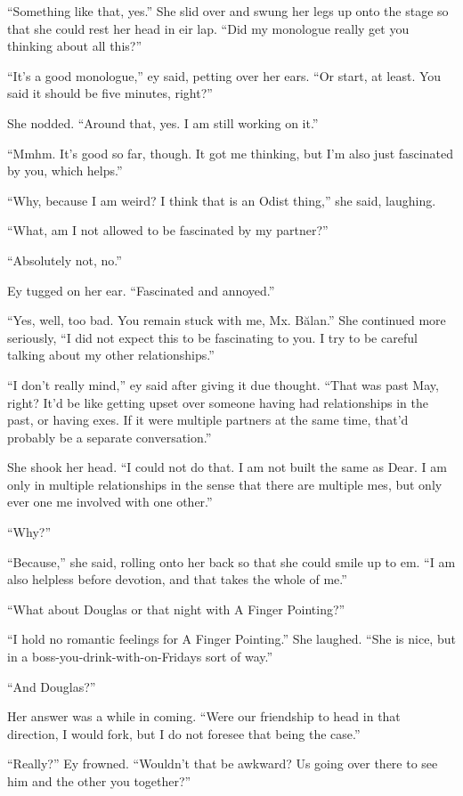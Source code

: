 ``Something like that, yes.'' She slid over and swung her legs up onto the stage so that she could rest her head in eir lap. ``Did my monologue really get you thinking about all this?''

``It's a good monologue,'' ey said, petting over her ears. ``Or start, at least. You said it should be five minutes, right?''

She nodded. ``Around that, yes. I am still working on it.''

``Mmhm. It's good so far, though. It got me thinking, but I'm also just fascinated by you, which helps.''

``Why, because I am weird? I think that is an Odist thing,'' she said, laughing.

``What, am I not allowed to be fascinated by my partner?''

``Absolutely not, no.''

Ey tugged on her ear. ``Fascinated and annoyed.''

``Yes, well, too bad. You remain stuck with me, Mx. Bălan.'' She continued more seriously, ``I did not expect this to be fascinating to you. I try to be careful talking about my other relationships.''

``I don't really mind,'' ey said after giving it due thought. ``That was past May, right? It'd be like getting upset over someone having had relationships in the past, or having exes. If it were multiple partners at the same time, that'd probably be a separate conversation.''

She shook her head. ``I could not do that. I am not built the same as Dear. I am only in multiple relationships in the sense that there are multiple mes, but only ever one me involved with one other.''

``Why?''

``Because,'' she said, rolling onto her back so that she could smile up to em. ``I am also helpless before devotion, and that takes the whole of me.''

``What about Douglas or that night with A Finger Pointing?''

``I hold no romantic feelings for A Finger Pointing.'' She laughed. ``She is nice, but in a boss-you-drink-with-on-Fridays sort of way.''

``And Douglas?''

Her answer was a while in coming. ``Were our friendship to head in that direction, I would fork, but I do not foresee that being the case.''

``Really?'' Ey frowned. ``Wouldn't that be awkward? Us going over there to see him and the other you together?''

